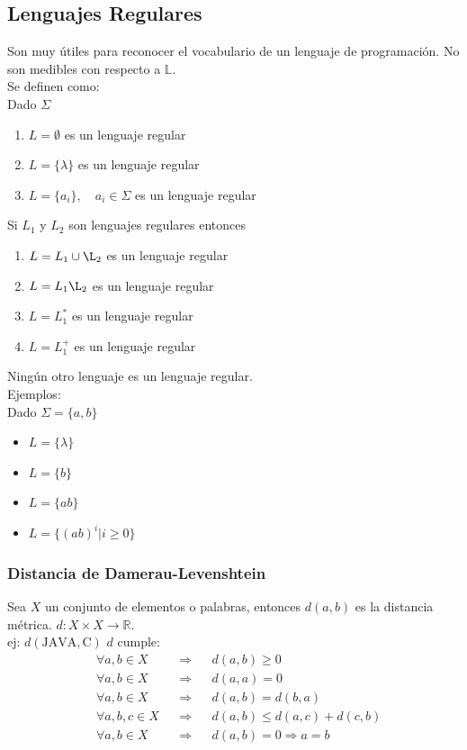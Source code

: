 \subsection{Lenguajes Regulares}
Son muy útiles para reconocer el vocabulario de un lenguaje de programación. No son medibles con respecto a $\mathbb{L}$.\\
Se definen como:\\
Dado $\Sigma$
\begin{enumerate}
    \item $L=\emptyset$ es un lenguaje regular
    \item $L=\{\lambda\}$ es un lenguaje regular
    \item $L=\{a_i\}, \quad a_i \in \Sigma$ es un lenguaje regular\\
    
\end{enumerate}
Si $L_1$ y $L_2$ son lenguajes regulares entonces
\begin{enumerate}
    \item $L=L_1\cup \L_2$ es un lenguaje regular
    \item $L=L_1 \L_2$ es un lenguaje regular
    \item $L=L_1^*$ es un lenguaje regular
    \item $L=L_1^+$ es un lenguaje regular
\end{enumerate}

Ningún otro lenguaje es un lenguaje regular.\\
Ejemplos:\\
Dado $\Sigma=\{a, b\}$
\begin{itemize}
    \item $L=\{\lambda\}$
    \item $L=\{b\}$
    \item $L=\{ab\}$
    \item $L=\{(ab)^i|i \geq 0\}$
\end{itemize}

\subsubsection*{Distancia de Damerau-Levenshtein}

Sea $X$ un conjunto de elementos o palabras, entonces $d(a, b)$ es la distancia métrica. $d:X\times X \rightarrow \mathbb{R}$.\\
ej: $d(\text{JAVA}, \text{C})$
$d$ cumple:\\

\begin{align*}
    &\forall a,b \in X && \Rightarrow && d(a, b) \geq 0\\
    &\forall a,b \in X && \Rightarrow && d(a, a) = 0\\
    &\forall a,b \in X && \Rightarrow && d(a, b) = d(b, a)\\
    &\forall a,b,c \in X && \Rightarrow && d(a, b) \leq d(a, c) + d(c, b)\\
    &\forall a,b \in X && \Rightarrow && d(a, b) = 0 \Rightarrow a = b\\
\end{align*}

